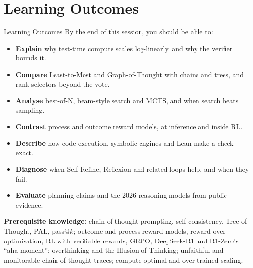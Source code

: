 \section{Learning Outcomes}

\begin{frame}{Learning Outcomes}
    By the end of this session, you should be able to:
    \vspace{0.2em}
    \begin{itemize}\itemsep0.2em
        \item \textbf{Explain} why test-time compute scales log-linearly, and why the verifier bounds it.
        \item \textbf{Compare} Least-to-Most and Graph-of-Thought with chains and trees, and rank selectors beyond the vote.
        \item \textbf{Analyse} best-of-N, beam-style search and MCTS, and when search beats sampling.
        \item \textbf{Contrast} process and outcome reward models, at inference and inside RL.
        \item \textbf{Describe} how code execution, symbolic engines and Lean make a check exact.
        \item \textbf{Diagnose} when Self-Refine, Reflexion and related loops help, and when they fail.
        \item \textbf{Evaluate} planning claims and the 2026 reasoning models from public evidence.
    \end{itemize}
    \vspace{0.1em}
    {\footnotesize \textbf{Prerequisite knowledge:} chain-of-thought prompting, self-consistency, Tree-of-Thought, PAL, pass@$k$; outcome and process reward models, reward over-optimisation, RL with verifiable rewards, GRPO; DeepSeek-R1 and R1-Zero's ``aha moment''; overthinking and the Illusion of Thinking; unfaithful and monitorable chain-of-thought traces; compute-optimal and over-trained scaling.\par}
\end{frame}
